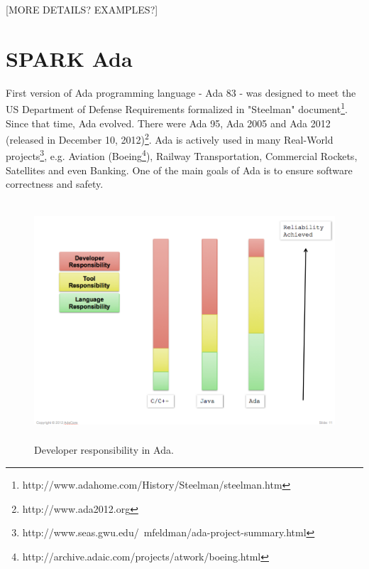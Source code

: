 [MORE DETAILS? EXAMPLES?]



\section{SPARK Ada}
\label{background:spark}


First version of Ada programming language - Ada 83 - was designed to meet the US Department of Defense Requirements formalized in "Steelman" document\footnote{http://www.adahome.com/History/Steelman/steelman.htm}. Since that time, Ada evolved. There were Ada 95, Ada 2005 and Ada 2012 (released in December 10, 2012)\footnote{http://www.ada2012.org}. Ada is actively used in many Real-World projects\footnote{http://www.seas.gwu.edu/~mfeldman/ada-project-summary.html}, e.g. Aviation (Boeing\footnote{http://archive.adaic.com/projects/atwork/boeing.html}), Railway Transportation, Commercial Rockets, Satellites and even Banking. One of the main goals of Ada is to ensure software correctness and safety.

\begin{figure}[ht]%
    \begin{center}
    	\includegraphics[height=3.5in]{figures/developer_responsibility_in_ada.png}
    	\caption{Developer responsibility in Ada\protect\footnotemark. }    	
    \end{center}
\end{figure}

